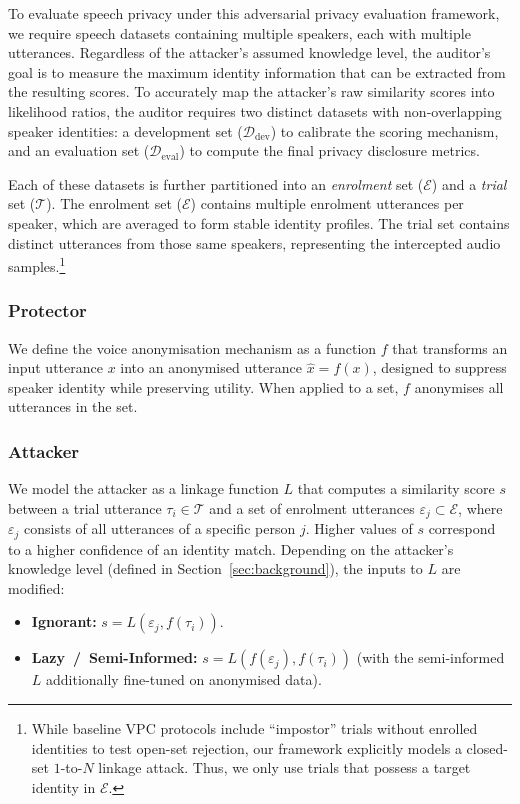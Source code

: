 To evaluate speech privacy under this adversarial privacy evaluation framework, we require speech datasets containing multiple speakers, each with multiple utterances. Regardless of the attacker's assumed knowledge level, the auditor's goal is to measure the maximum identity information that can be extracted from the resulting scores. To accurately map the attacker's raw similarity scores into likelihood ratios, the auditor requires two distinct datasets with non-overlapping speaker identities: a development set ($\mathcal{D}_{\text{dev}}$) to calibrate the scoring mechanism, and an evaluation set ($\mathcal{D}_{\text{eval}}$) to compute the final privacy disclosure metrics.

Each of these datasets is further partitioned into an \textit{enrolment} set ($\mathcal{E}$) and a \textit{trial} set ($\mathcal{T}$). 
The enrolment set ($\mathcal{E}$) contains multiple enrolment utterances per speaker, which are averaged to form stable identity profiles. The trial set contains distinct utterances from those same speakers, representing the intercepted audio samples.\footnote{While baseline VPC protocols include ``impostor'' trials without enrolled identities to test open-set rejection, our framework explicitly models a closed-set $1$-to-$N$ linkage attack. Thus, we only use trials that possess a target identity in $\mathcal{E}$.}

\subsubsection{Protector}
We define the voice anonymisation mechanism as a function $f$ that transforms an input utterance $x$ into an anonymised utterance $\hat{x} = f(x)$, designed to suppress speaker identity while preserving utility. When applied to a set, $f$ anonymises all utterances in the set.

\subsubsection{Attacker}
We model the attacker as a linkage function $L$ that computes a similarity score $s$ between a trial utterance $\tau_i \in \mathcal{T}$ and a set of enrolment utterances $\varepsilon_j \subset \mathcal{E}$, where $\varepsilon_j$ consists of all utterances of a specific person $j$. Higher values of $s$ correspond to a higher confidence of an identity match. Depending on the attacker's knowledge level (defined in Section~\ref{sec:background}), the inputs to $L$ are modified:
\begin{itemize}
    \item \textbf{Ignorant:} $s = L(\varepsilon_j, f(\tau_i))$.
    \item \textbf{Lazy~/~Semi-Informed:} $s = L(f(\varepsilon_j), f(\tau_i))$ (with the semi-informed $L$ additionally fine-tuned on anonymised data).
\end{itemize}


